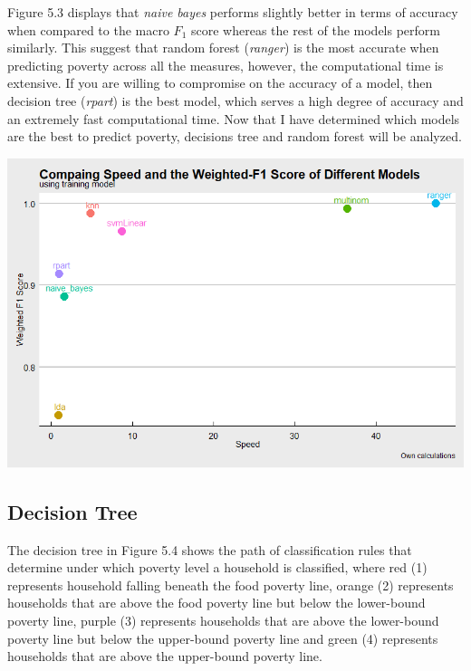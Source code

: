 \documentclass[11pt,preprint, authoryear]{elsarticle}
\let\origfigure\figure
\let\endorigfigure\endfigure
\renewenvironment{figure}[1][2] {
    \expandafter\origfigure\expandafter[H]
} {
    \endorigfigure
}
\numberwithin{equation}{section}
\numberwithin{figure}{section}
\numberwithin{table}{section}
\begin{document}
Figure 5.3 displays that \emph{naive bayes} performs slightly better in
terms of accuracy when compared to the macro \(F_1\) score whereas the
rest of the models perform similarly. This suggest that random forest
(\emph{ranger}) is the most accurate when predicting poverty across all
the measures, however, the computational time is extensive. If you are
willing to compromise on the accuracy of a model, then decision tree
(\emph{rpart}) is the best model, which serves a high degree of accuracy
and an extremely fast computational time. Now that I have determined
which models are the best to predict poverty, decisions tree and random
forest will be analyzed.

\begin{figure}
\centerline{\includegraphics[scale=0.65]{weightedF1.png}}
\caption{Speed versus Weighted F1 }
\end{figure}

\hypertarget{decision-tree-1}{%
\subsection{Decision Tree}\label{decision-tree-1}}

The decision tree in Figure 5.4 shows the path of classification rules
that determine under which poverty level a household is classified,
where red (1) represents household falling beneath the food poverty
line, orange (2) represents households that are above the food poverty
line but below the lower-bound poverty line, purple (3) represents
households that are above the lower-bound poverty line but below the
upper-bound poverty line and green (4) represents households that are
above the upper-bound poverty line.
\end{document}
